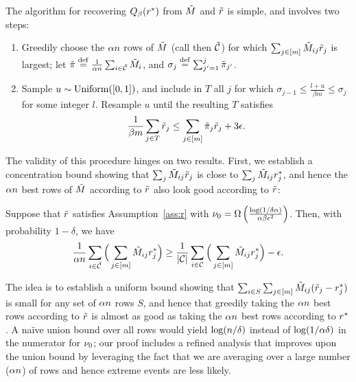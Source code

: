 The algorithm for recovering $Q_{\beta}(r^*)$ from $\tilde{M}$ and $\tilde{r}$ 
is simple, and involves two steps:
\begin{enumerate}
\item Greedily choose the $\alpha n$ rows of $\tilde{M}$ (call then $\tilde{\mathcal{C}}$) 
      for which $\sum_{j \in [m]} \tilde{M}_{ij}\tilde{r}_j$ is largest;
      let $\tilde{\pi} \stackrel{\rm def}{=} \frac{1}{\alpha n} \sum_{i \in \tilde{\mathcal{C}}} \tilde{M}_i$, and 
      $\sigma_j \stackrel{\rm def}{=} \sum_{j'=1}^j \tilde{\pi}_{j'}$.
\item Sample $u \sim \operatorname{Uniform}([0,1])$, and include in $T$ all $j$ for which 
      $\sigma_{j-1} \leq \frac{l + u}{\beta m} \leq \sigma_j$ 
      for some integer $l$. Resample $u$ until the resulting $T$ satisfies 
      \begin{equation}
      \label{eq:accept}
      \frac{1}{\beta m} \sum_{j \in T} \tilde{r}_j \leq \sum_{j \in [m]} \tilde{\pi}_j \tilde{r}_j + 3\epsilon.
      \end{equation}
\end{enumerate}
The validity of this procedure hinges on two results. First, we establish 
a concentration bound showing that $\sum_j \tilde{M}_{ij}\tilde{r}_j$ is close to 
$\sum_j \tilde{M}_{ij}r^*_j$, and hence the $\alpha n$ best rows of $\tilde{M}$ 
according to $\tilde{r}$ also look good according to $\tilde{r}$:
\begin{proposition}
\label{prop:robs-rtrue}
Suppose that $\tilde{r}$ satisfies Assumption~\ref{ass:r} with 
$\nu_0 = \Omega\left( \frac{\log(1/\delta\alpha)}{\alpha\beta\epsilon^2} \right)$. 
Then, with probability $1-\delta$, we have
\begin{equation}
\label{eq:robs-rtrue}
\frac{1}{\alpha n} \sum_{i \in \tilde{\mathcal{C}}} \Big(\sum_{j \in [m]} \tilde{M}_{ij}r^*_j\Big) \geq \frac{1}{|\mathcal{C}|} \sum_{i \in \mathcal{C}} \Big(\sum_{j \in [m]} \tilde{M}_{ij}r^*_j\Big) - \epsilon.
\end{equation}
\end{proposition}
The idea is to establish a uniform bound showing that 
$\sum_{i \in S} \sum_{j \in [m]} \tilde{M}_{ij}(\tilde{r}_j - r^*_j)$ is small for any 
set of $\alpha n$ rows $S$, and hence that greedily taking the $\alpha n$ 
best rows according to $\tilde{r}$ is almost as good as taking the $\alpha n$ 
best rows according to $r^*$. A na\"{i}ve union bound over all rows would 
yield $\log(n/\delta)$ instead of $\log(1/\alpha\delta)$ in the numerator 
for $\nu_0$; our proof includes a refined analysis that improves upon the union 
bound by leveraging the fact that we are averaging over a large number 
($\alpha n$) of rows and hence extreme events are less likely.

